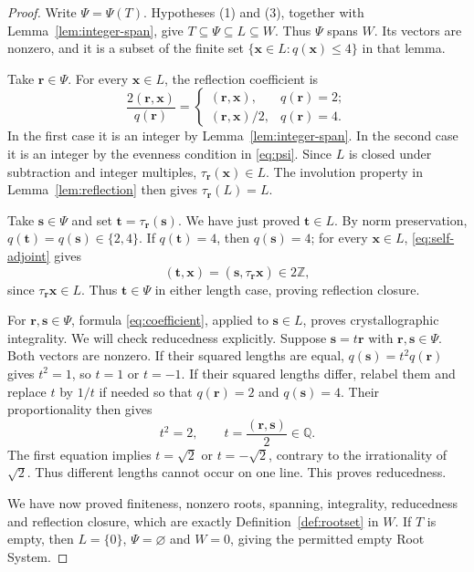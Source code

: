 \documentclass[11pt]{amsart}
\newcommand\ints{{\mathbb Z}}
\newcommand\rats{{\mathbb Q}}
\newcommand\Zx{{\mathbf x}}
\newcommand\sbs{\subseteq}
\theoremstyle{definition}
\newcommand{\Zr}{{\mathbf r}}
\newcommand{\Zs}{{\mathbf s}}
\newcommand{\Zt}{{\mathbf t}}
\begin{document}
\begin{proof}
Write $\Psi=\Psi(T)$. Hypotheses (1) and (3), together with
Lemma~\ref{lem:integer-span}, give $T\sbs\Psi\sbs L\sbs W$.
Thus $\Psi$ spans $W$. Its vectors are nonzero, and it is a subset
of the finite set $\{\Zx\in L:q(\Zx)\leq4\}$ in that lemma.

Take $\Zr\in\Psi$. For every $\Zx\in L$, the reflection coefficient is
\begin{equation}\label{eq:coefficient}
 \frac{2(\Zr,\Zx)}{q(\Zr)}
 =\begin{cases}
   (\Zr,\Zx),&q(\Zr)=2;\\
   (\Zr,\Zx)/2,&q(\Zr)=4.
  \end{cases}
\end{equation}
In the first case it is an integer by Lemma~\ref{lem:integer-span}.
In the second case it is an integer by the evenness condition in
\eqref{eq:psi}.
Since $L$ is closed under subtraction and integer multiples,
$\tau_{\Zr}(\Zx)\in L$. The involution property in
Lemma~\ref{lem:reflection} then gives $\tau_{\Zr}(L)=L$.

Take $\Zs\in\Psi$ and set $\Zt=\tau_{\Zr}(\Zs)$.
We have just proved $\Zt\in L$. By norm preservation,
$q(\Zt)=q(\Zs)\in\{2,4\}$. If $q(\Zt)=4$, then
$q(\Zs)=4$; for every $\Zx\in L$, \eqref{eq:self-adjoint} gives
\[
 (\Zt,\Zx)=(\Zs,\tau_{\Zr}\Zx)\in2\ints,
\]
since $\tau_{\Zr}\Zx\in L$. Thus $\Zt\in\Psi$ in either length
case, proving reflection closure.

For $\Zr,\Zs\in\Psi$, formula \eqref{eq:coefficient}, applied
to $\Zs\in L$, proves crystallographic integrality. We will check
reducedness explicitly. Suppose $\Zs=t\Zr$ with
$\Zr,\Zs\in\Psi$. Both vectors are nonzero. If their squared
lengths are equal, $q(\Zs)=t^2q(\Zr)$ gives $t^2=1$, so
$t=1$ or $t=-1$. If their squared lengths differ, relabel them
and replace $t$ by $1/t$ if needed so that $q(\Zr)=2$ and
$q(\Zs)=4$. Their proportionality then
gives
\[
 t^2=2,\qquad t=\frac{(\Zr,\Zs)}2\in\rats.
\]
The first equation implies $t=\sqrt2$ or $t=-\sqrt2$, contrary
to the irrationality of $\sqrt2$. Thus different lengths cannot
occur on one line. This proves reducedness.

We have now proved finiteness, nonzero roots, spanning, integrality,
reducedness and reflection closure, which are exactly
Definition~\ref{def:rootset} in $W$. If $T$ is empty, then $L=\{0\}$,
$\Psi=\varnothing$ and $W=0$, giving the permitted empty Root System.
\end{proof}
\end{document}
